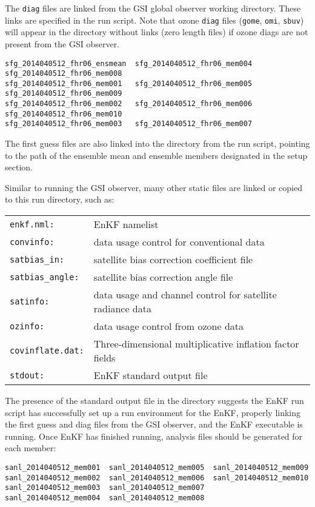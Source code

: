 The \verb|diag| files are linked from the GSI global observer working directory. These links are specified in the run script. Note that ozone \verb|diag| files (\verb|gome|, \verb|omi|, \verb|sbuv|) will appear in the directory without links (zero length files) if ozone diags are not present from the GSI observer.

\begin{footnotesize}
\begin{verbatim}
sfg_2014040512_fhr06_ensmean  sfg_2014040512_fhr06_mem004  sfg_2014040512_fhr06_mem008
sfg_2014040512_fhr06_mem001   sfg_2014040512_fhr06_mem005  sfg_2014040512_fhr06_mem009
sfg_2014040512_fhr06_mem002   sfg_2014040512_fhr06_mem006  sfg_2014040512_fhr06_mem010
sfg_2014040512_fhr06_mem003   sfg_2014040512_fhr06_mem007
\end{verbatim}
\end{footnotesize}

The first guess files are also linked into the directory from the run script, pointing to the path of the ensemble mean and ensemble members designated in the setup section.

Similar to running the GSI observer, many other static files are linked or copied to this run directory, such as:
\begin{table}[htbp]
\centering
\begin{tabular}{ll}
\verb|enkf.nml: |           &   EnKF namelist\\
\verb|convinfo:  |          &  data usage control for conventional data\\
\verb|satbias_in:|         &  satellite bias correction coefficient file\\
\verb|satbias_angle:|   &  satellite bias correction angle file\\
\verb|satinfo:|               &  data usage and channel control for satellite radiance data\\
\verb|ozinfo: |               &  data usage control from ozone data\\
\verb|covinflate.dat:|    &  Three-dimensional multiplicative inflation factor fields\\
\verb|stdout:|               &   EnKF standard output file  \\    
\end{tabular}
\end{table}

The presence of the standard output file in the directory suggests the EnKF run script has successfully set up a run environment for the EnKF, properly linking the first guess and diag files from the GSI observer, and the EnKF executable is running. Once EnKF has finished running, analysis files should be generated for each member:
\begin{footnotesize}
\begin{verbatim}
sanl_2014040512_mem001  sanl_2014040512_mem005  sanl_2014040512_mem009
sanl_2014040512_mem002  sanl_2014040512_mem006  sanl_2014040512_mem010
sanl_2014040512_mem003  sanl_2014040512_mem007
sanl_2014040512_mem004  sanl_2014040512_mem008
\end{verbatim}
\end{footnotesize}

